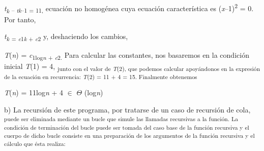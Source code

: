 \documentclass[12pt]{article}
\renewcommand{\_}{\kern-1.5pt\textunderscore\kern-1.5pt}
\begin{document}
\begin{adjustwidth}{0.77in}{0.8in}
\begin{Center}
{\fontsize{10pt}{12.0pt}\selectfont \textit{t\textsubscript{k }}\textsubscript{– \textit{tk}–1 = 11, }ecuación no homogénea cuya ecuación característica es (\textit{x}–1)\textsuperscript{2 }= 0. Por tanto, \par}
\end{Center}\par

\end{adjustwidth}

\begin{adjustwidth}{0.77in}{2.76in}
{\fontsize{10pt}{12.0pt}\selectfont \textit{t\textsubscript{k }}\textsubscript{= \textit{c}1\textit{k }+ \textit{c}2 }y, deshaciendo los cambios, \par}\par

\end{adjustwidth}

\begin{adjustwidth}{0.77in}{0.57in}
\begin{Center}
{\fontsize{10pt}{12.0pt}\selectfont \textit{T}(\textit{n}) = \textit{c}\textsubscript{1log\textit{n }+ \textit{c}2. }Para calcular las constantes, nos basaremos en la condición inicial \textit{T}(1) = 4, \textsubscript{junto con el valor de \textit{T}(2), que podemos calcular apoyándonos en la expresión de la ecuación en recurrencia: \textit{T}(2) = 11 + 4 = 15. Finalmente obtenemos }\par}
\end{Center}\par

\end{adjustwidth}

\begin{adjustwidth}{2.25in}{2.25in}
{\fontsize{10pt}{12.0pt}\selectfont \textit{T}(\textit{n}) = 11log\textit{n }+ 4 $ \in $  $ \Theta $ (log\textit{n}) \par}\par

\end{adjustwidth}

\begin{adjustwidth}{0.58in}{0.57in}
{\fontsize{10pt}{12.0pt}\selectfont b) La recursión de este programa, por tratarse de un caso de recursión de cola, \textsubscript{puede ser eliminada mediante un bucle que simule las llamadas recursivas a la función. La condición de terminación del bucle puede ser tomada del caso base de la función recursiva y el cuerpo de dicho bucle consiste en una preparación de los argumentos de la función recursiva y el cálculo que ésta realiza: }\par}\par

\end{adjustwidth}
\end{document}
